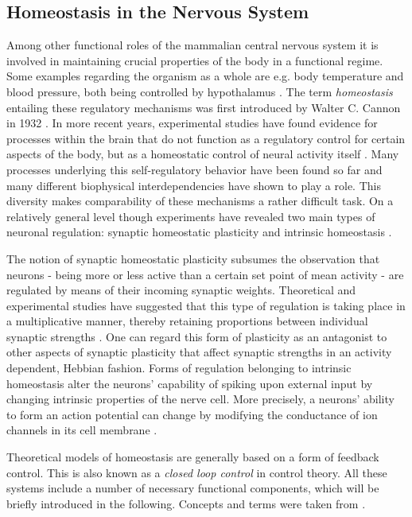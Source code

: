 \documentclass[10pt,a4paper]{article}
\begin{document}
\subsection{Homeostasis in the Nervous System}
Among other functional roles of the mammalian central nervous system it is involved in maintaining crucial properties of the body in a functional regime. Some examples regarding the organism as a whole are e.g. body temperature and blood pressure, both being controlled by hypothalamus \cite[p. 484]{Bear_Exploring_the_Brain}. The term \textit{homeostasis} entailing these regulatory mechanisms was first introduced by Walter C. Cannon in 1932 \cite{Wisdom_of_the_Body_Cannon, Homeostasis_Queenan_2012}. In more recent years, experimental studies have found evidence for processes within the brain that do not function as a regulatory control for certain aspects of the body, but as a homeostatic control of neural activity itself \cite{Turrigiano_1994,Burrone_2003}. Many processes underlying this self-regulatory behavior have been found so far and many different biophysical interdependencies have shown to play a role. This diversity makes comparability of these mechanisms a rather difficult task. On a relatively general level though experiments have revealed two main types of neuronal regulation: synaptic homeostatic plasticity and intrinsic homeostasis \cite{Desai_2003}. 

The notion of synaptic homeostatic plasticity subsumes the observation that neurons - being more or less active than a certain set point of mean activity - are regulated by means of their incoming synaptic weights. Theoretical and experimental studies have suggested that this type of regulation is taking place in a multiplicative manner, thereby retaining proportions between individual synaptic strengths \cite{Syn_Plast_Abbott}. One can regard this form of plasticity as an antagonist to other aspects of synaptic plasticity that affect synaptic strengths in an activity dependent, Hebbian fashion. Forms of regulation belonging to intrinsic homeostasis alter the neurons' capability of spiking upon external input by changing intrinsic properties of the nerve cell. More precisely, a neurons' ability to form an action potential can change by modifying the conductance of ion channels in its cell membrane \cite[p. 156]{Theor_Neur_Dayan}.

Theoretical models of homeostasis are generally based on a form of feedback control. This is also known as a \textit{closed loop control} in control theory. All these systems include a number of necessary functional components, which will be briefly introduced in the following. Concepts and terms were taken from \cite[p. 59-64]{Cybernetik_Systems_Cruse_2006}.
\newpage
\end{document}
